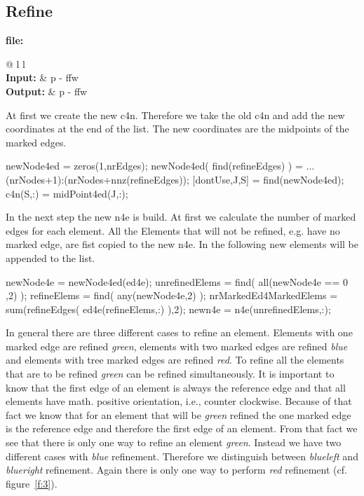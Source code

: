 \subsection{Refine}

\textbf{file:} \\[1.5ex]
\begin{tabular}{@{} l l}
 \\
\textbf{Input:}  & p - ffw\\
\textbf{Output:} & p - ffw\\
\end{tabular}

\medskip
\noindent
At first we create the new c4n. Therefore we take the old c4n 
and add the new coordinates at the end of the list. The new 
coordinates are the midpoints of the marked edges.
%
\begin{pcode}
newNode4ed = zeros(1,nrEdges);
newNode4ed( find(refineEdges) ) = ...
     (nrNodes+1):(nrNodes+nnz(refineEdges));
[dontUse,J,S] = find(newNode4ed);
c4n(S,:) = midPoint4ed(J,:);
\end{pcode}
%
In the next step the new n4e is build. At first we calculate the 
number of marked edges for each element. All the Elements that will 
not be refined, e.g. have no marked edge, are fist copied to the new n4e.
In the following new elements will be appended to the list.
%
\begin{pcode}
newNode4e = newNode4ed(ed4e);
unrefinedElems = find( all(newNode4e == 0 ,2) );
refineElems = find( any(newNode4e,2) );
nrMarkedEd4MarkedElems = sum(refineEdges( ed4e(refineElems,:) ),2);
newn4e = n4e(unrefinedElems,:);
\end{pcode}
%
In general there are three different cases to refine an element. 
Elements with one marked edge are refined \emph{green}, elements with 
two marked edges are refined \emph{blue} and elements with tree 
marked edges are refined \emph{red}. To refine all the elements
that are to be refined \emph{green} can be refined simultaneously.
It is important to know that the first edge of an element is 
always the reference edge and that all elements have math. positive 
orientation, i.e., counter clockwise. Because of that fact we know that 
for an element that will be \emph{green} refined the one marked edge is 
the reference edge and therefore the first edge of an element. 
From that fact we see that there is only one way to refine an element \emph{green}. 
Instead we have two different cases with \emph{blue} refinement. 
Therefore we distinguish between \emph{blueleft} and \emph{blueright}
refinement. Again there is only one way to perform \emph{red} refinement
(cf. figure~\ref{f:3}).

